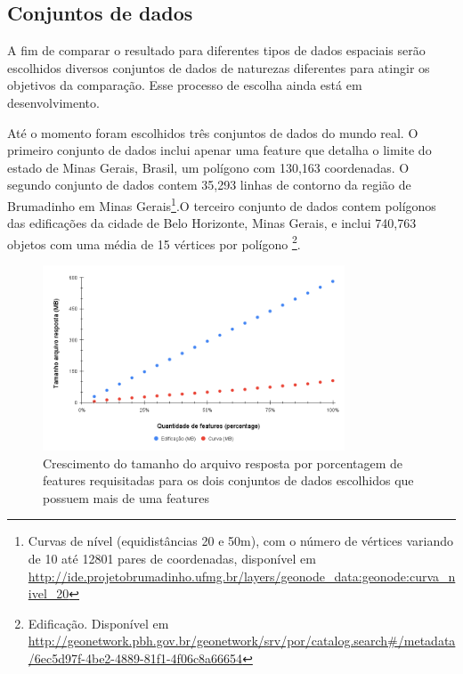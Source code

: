 \subsection{Conjuntos de dados}

A fim de comparar o resultado para diferentes tipos de dados espaciais serão escolhidos diversos conjuntos de dados de naturezas diferentes para atingir os objetivos da comparação. Esse processo de escolha ainda está em desenvolvimento.




Até o momento foram escolhidos três conjuntos de dados do mundo real. O primeiro conjunto de dados inclui apenar uma feature que detalha o limite do estado de Minas Gerais, Brasil, um polígono com 130,163 coordenadas. O segundo conjunto de dados contem 35,293 linhas de contorno da região de Brumadinho em Minas Gerais\footnote{Curvas de nível (equidistâncias 20 e 50m), com o número de vértices variando de 10 até 12801 pares de coordenadas, disponível em \url{http://ide.projetobrumadinho.ufmg.br/layers/geonode_data:geonode:curva_nivel_20}}.O terceiro conjunto de dados contem polígonos das edificações da cidade de Belo Horizonte, Minas Gerais, e inclui 740,763 objetos com uma média de 15 vértices por polígono \footnote{Edificação. Disponível em \url{http://geonetwork.pbh.gov.br/geonetwork/srv/por/catalog.search\#/metadata/6ec5d97f-4be2-4889-81f1-4f06c8a66654}}.


\begin{figure}[H]
\centering
\includegraphics[width=0.8\textwidth]{img/chart.png}
\caption{Crescimento do tamanho do arquivo resposta por porcentagem de features requisitadas para os dois conjuntos de dados escolhidos que possuem mais de uma features}
\label{fig:comparesizes}
\end{figure}


